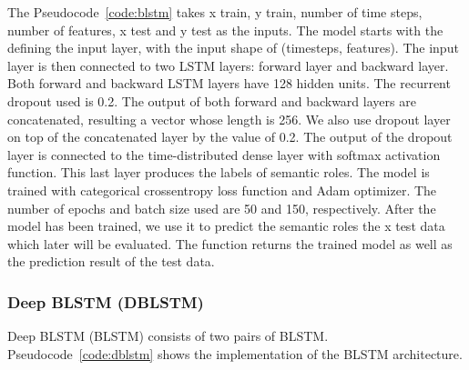 The Pseudocode~\ref{code:blstm} takes x train, y train, number of time steps, number of features, x test and y test as the inputs. The model starts with the defining the input layer, with the input shape of (timesteps, features). The input layer is then connected to two LSTM layers: forward layer and backward layer. Both forward and backward LSTM layers have 128 hidden units. The recurrent dropout used is 0.2. The output of both forward and backward layers are concatenated, resulting a vector whose length is 256. We also use dropout layer on top of the concatenated layer by the value of 0.2. The output of the dropout layer is connected to the time-distributed dense layer with softmax activation function. This last layer produces the labels of semantic roles. The model is trained with categorical crossentropy loss function and Adam optimizer. The number of epochs and batch size used are 50 and 150, respectively. After the model has been trained, we use it to predict the semantic roles the x test data which later will be evaluated. The function returns the trained model as well as the prediction result of the test data.

\subsubsection{Deep BLSTM (DBLSTM)}
Deep BLSTM (BLSTM) consists of two pairs of BLSTM. Pseudocode~\ref{code:dblstm} shows the implementation of the BLSTM architecture.

